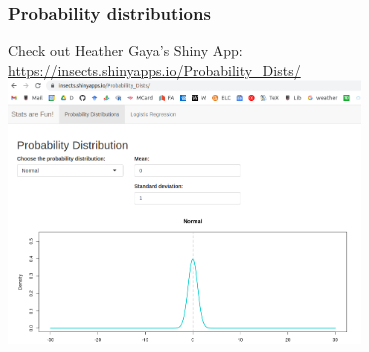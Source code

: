 \documentclass[color=usenames,dvipsnames]{beamer}\usepackage[]{graphicx}\usepackage[]{color}
\begin{document}
\begin{frame}[fragile]
  \frametitle{Probability distributions}
  Check out Heather Gaya's Shiny App: \\
  \vfill
  \centering
  \href{ 
    https://insects.shinyapps.io/Probability_Dists/
  }{
    \large
    \color{blue}
    {https://insects.shinyapps.io/Probability\_Dists/} 
  } \\
  \vfill
  \includegraphics[width=0.7\textwidth]{figs/probDists} \\
\end{frame}
\end{document}
